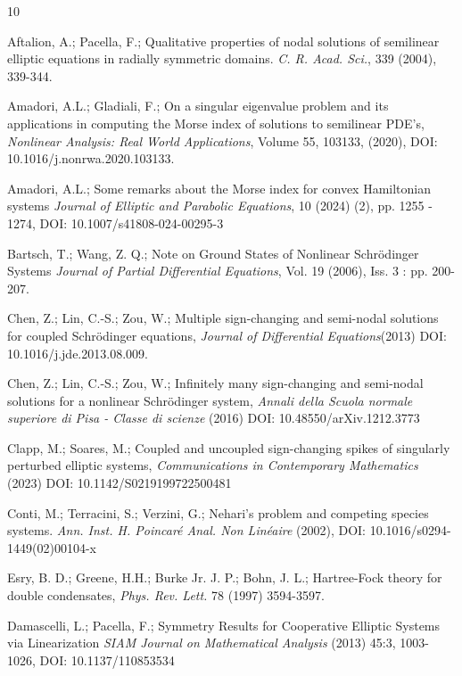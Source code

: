 \documentclass[reqno]{amsart}
\begin{document}
 \begin{thebibliography}{10}

 Aftalion, A.; Pacella, F.;
 Qualitative properties of nodal solutions of semilinear
 elliptic equations in radially symmetric domains.
 \emph{C. R. Acad. Sci.}, 339 (2004), 339-344.

Amadori, A.L.; Gladiali, F.;
 On a singular eigenvalue problem and its applications in computing the Morse index of solutions to semilinear PDE’s,
 \emph{Nonlinear Analysis: Real World Applications},
 Volume 55,  103133, (2020),
 DOI: 10.1016/j.nonrwa.2020.103133.

Amadori, A.L.;
 Some remarks about the Morse index for convex Hamiltonian systems
\emph{Journal of Elliptic and Parabolic Equations}, 10  (2024) (2), pp. 1255 - 1274,
 DOI: 10.1007/s41808-024-00295-3

 Bartsch, T.; Wang, Z. Q.;
 Note on Ground States of Nonlinear Schr\"{o}dinger Systems
\emph{Journal of Partial Differential Equations}, Vol. 19 (2006), Iss. 3 : pp. 200-207.

Chen, Z.; Lin, C.-S.; Zou, W.;
Multiple sign-changing and semi-nodal solutions for coupled Schr\"{o}dinger equations,
\emph{Journal of Differential Equations}(2013)
DOI: 10.1016/j.jde.2013.08.009.

Chen, Z.; Lin, C.-S.; Zou, W.;
Infinitely many sign-changing and semi-nodal solutions for a nonlinear Schr\"{o}dinger
system, \emph{Annali della Scuola normale superiore di Pisa - Classe di scienze} (2016)
DOI: 10.48550/arXiv.1212.3773

Clapp, M.; Soares, M.;
Coupled and uncoupled sign-changing spikes of singularly perturbed elliptic systems,
 \emph{Communications in Contemporary Mathematics} (2023) DOI: 10.1142/S0219199722500481

Conti, M.; Terracini, S.;  Verzini, G.;
 Nehari's problem and competing species systems.
\emph{Ann. Inst. H. Poincar\'e Anal. Non Lin\'eaire} (2002),
DOI: 10.1016/s0294-1449(02)00104-x

Esry, B. D.; Greene, H.H.; Burke Jr. J. P.; Bohn, J. L.;
Hartree-Fock theory for double condensates, \emph{Phys. Rev. Lett.} 78 (1997) 3594-3597.

 Damascelli, L.; Pacella, F.;
Symmetry Results for Cooperative Elliptic Systems via Linearization
\emph{SIAM Journal on Mathematical Analysis} (2013) 45:3, 1003-1026,
DOI: 10.1137/110853534


\end{thebibliography}
\end{document}
